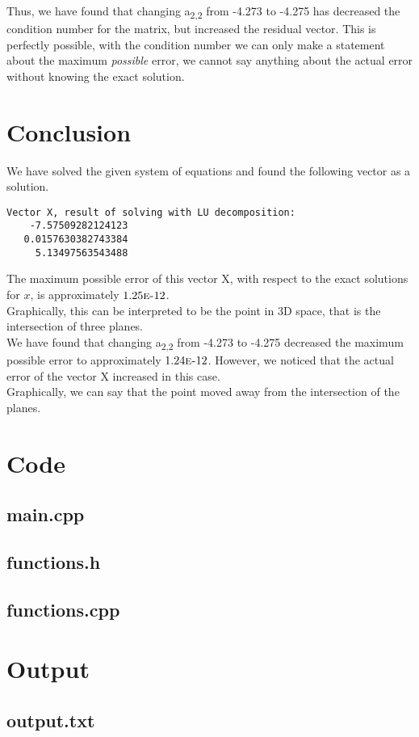 \documentclass[11pt, a4paper, titlepage, openright]{article}
\begin{document}
    Thus, we have found that changing a\textsubscript{2,2} from -4.273 to -4.275 has decreased the condition
    number for the matrix, but increased the residual vector. This is perfectly possible, with the condition
    number we can only make a statement about the maximum \emph{possible} error, we cannot say anything about
    the actual error without knowing the exact solution.
\section{Conclusion}
    We have solved the given system of equations and found the following vector as a solution.
\begin{lstlisting}
Vector X, result of solving with LU decomposition:
    -7.57509282124123
   0.0157630382743384
     5.13497563543488
\end{lstlisting}
    The maximum possible error of this vector X, with respect to the exact solutions for \(x\),
    is approximately \(1.25\mbox{\sc{e}-}12\). \\
    Graphically, this can be interpreted to be the point in 3D space, that is the intersection of three planes.\\
    
    We have found that changing a\textsubscript{2,2} from -4.273 to -4.275 decreased the maximum possible error
    to approximately \(1.24\mbox{\sc{e}-}12\). However, we noticed that the actual error of the vector X increased in this case.\\
    Graphically, we can say that the point moved away from the intersection of the planes.

\onecolumn
\appendix
\appendixpage
\addappheadtotoc

\section{Code}
	\subsection{main.cpp}
		 
	\bigskip
	\subsection{functions.h}
		
	\bigskip
	\subsection{functions.cpp}
		

\newpage
\section{Output}
	\subsection{output.txt}
		 
		
\end{document}
